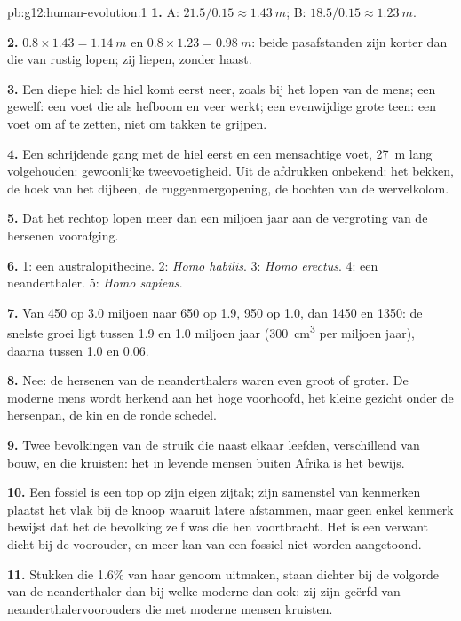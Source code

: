 \begin{solution}{pb:g12:human-evolution:1}
\textbf{1.} A: $21.5/0.15 \approx \qty{1.43}{m}$; B: $18.5/0.15
\approx \qty{1.23}{m}$.

\textbf{2.} $0.8 \times 1.43 = \qty{1.14}{m}$ en $0.8 \times 1.23 =
\qty{0.98}{m}$: beide pasafstanden zijn korter dan die van rustig lopen;
zij liepen, zonder haast.

\textbf{3.} Een diepe hiel: de hiel komt eerst neer, zoals bij het lopen
van de mens; een gewelf: een voet die als hefboom en veer werkt; een
evenwijdige grote teen: een voet om af te zetten, niet om takken te grijpen.

\textbf{4.} Een schrijdende gang met de hiel eerst en een mensachtige
voet, \qty{27}{m} lang volgehouden: gewoonlijke tweevoetigheid. Uit de
afdrukken onbekend: het bekken, de hoek van het dijbeen, de
ruggenmergopening, de bochten van de wervelkolom.

\textbf{5.} Dat het rechtop lopen meer dan een miljoen jaar aan de
vergroting van de hersenen voorafging.

\textbf{6.} 1: een australopithecine. 2: \emph{Homo habilis}. 3:
\emph{Homo erectus}. 4: een neanderthaler. 5: \emph{Homo sapiens}.

\textbf{7.} Van 450 op 3.0 miljoen naar 650 op 1.9, 950 op 1.0, dan 1450
en 1350: de snelste groei ligt tussen 1.9 en 1.0 miljoen jaar
(\qty{300}{cm^3} per miljoen jaar), daarna tussen 1.0 en 0.06.

\textbf{8.} Nee: de hersenen van de neanderthalers waren even groot of
groter. De moderne mens wordt herkend aan het hoge voorhoofd, het kleine
gezicht onder de hersenpan, de kin en de ronde schedel.

\textbf{9.} Twee bevolkingen van de struik die naast elkaar leefden,
verschillend van bouw, en die kruisten: het  in levende
mensen buiten Afrika is het bewijs.

\textbf{10.} Een fossiel is een top op zijn eigen zijtak; zijn samenstel
van kenmerken plaatst het vlak bij de knoop waaruit latere 
afstammen, maar geen enkel kenmerk bewijst dat het de bevolking zelf was
die hen voortbracht. Het is een verwant dicht bij de voorouder, en meer
kan van een fossiel niet worden aangetoond.

\textbf{11.} Stukken die 1.6\% van haar genoom uitmaken, staan dichter bij
de volgorde van de neanderthaler dan bij welke moderne dan ook: zij zijn
geërfd van neanderthalervoorouders die met moderne mensen kruisten.


\end{solution}
